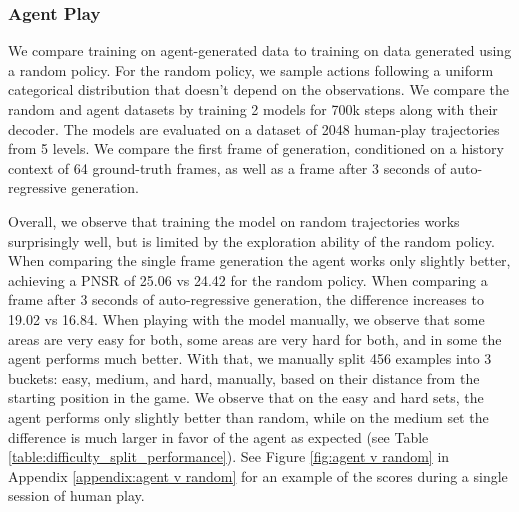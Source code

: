 \documentclass{article} %
\begin{document}
\subsubsection{Agent Play}
\label{agent-play-ablation}

We compare training on agent-generated data to training on data generated using a random policy. For the random policy, we sample actions following a uniform categorical distribution that doesn't depend on the observations. We compare the random and agent datasets by training 2 models for 700k steps along with their decoder. The models are evaluated on a dataset of 2048 human-play trajectories from 5 levels. We compare the first frame of generation, conditioned on a history context of 64 ground-truth frames, as well as a frame after 3 seconds of auto-regressive generation.

Overall, we observe that training the model on random trajectories works surprisingly well, but is limited by the exploration ability of the random policy.
When comparing the single frame generation the agent works only slightly better, achieving a PNSR of 25.06 vs 24.42 for the random policy.
When comparing a frame after 3 seconds of auto-regressive generation, the difference increases to 19.02 vs 16.84.
When playing with the model manually, we observe that some areas are very easy for both, some areas are very hard for both, and in some the agent performs much better. With that, we manually split 456 examples into 3 buckets: easy, medium, and hard, manually, based on their distance from the starting position in the game.
We observe that on the easy and hard sets, the agent performs only slightly better than random, while on the medium set the difference is much larger in favor of the agent as expected (see Table \ref{table:difficulty_split_performance}). See Figure \ref{fig:agent v random} in Appendix \ref{appendix:agent v random} for an example of the scores during a single session of human play.
\end{document}
